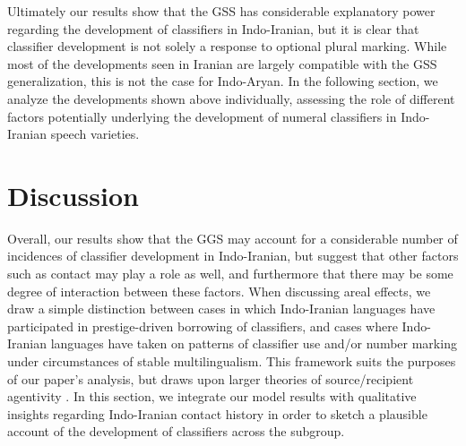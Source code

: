 \documentclass[11pt]{article}
\begin{document}
Ultimately our results show that the GSS has considerable explanatory power regarding the development of classifiers in Indo-Iranian, but it is clear that classifier development is not solely a response to optional plural marking. While most of the developments seen in Iranian are largely compatible with the GSS generalization, this is not the case for Indo-Aryan. 
In the following section, we analyze the developments shown above individually, assessing the role of different factors potentially underlying the development of numeral classifiers in Indo-Iranian speech varieties. 

\section{Discussion}
Overall, our results show that the GGS may account for a considerable number of incidences of classifier development in Indo-Iranian, but suggest that other factors such as contact may play a role as well, and furthermore that there may be some degree of interaction between these factors. 
When discussing areal effects, we draw a simple distinction between cases in which Indo-Iranian languages have participated in prestige-driven borrowing of classifiers, and cases where Indo-Iranian languages have taken on patterns of classifier use and/or number marking under circumstances of stable multilingualism. This framework suits the purposes of our paper's analysis, but draws upon larger theories of source/recipient agentivity \citep{Ross1996,Winford2005,MatrasSakel2007}. 
In this section, we integrate our model results with qualitative insights regarding Indo-Iranian contact history in order to sketch a plausible account of the development of classifiers across the subgroup. 
\end{document}
